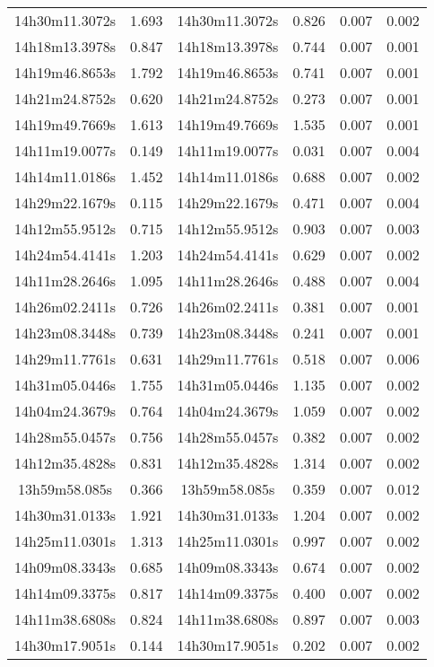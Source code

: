 \begin{table}
\begin{tabular}{cccccc}
14h30m11.3072s & 1.693 & 14h30m11.3072s & 0.826 & 0.007 & 0.002 \\
14h18m13.3978s & 0.847 & 14h18m13.3978s & 0.744 & 0.007 & 0.001 \\
14h19m46.8653s & 1.792 & 14h19m46.8653s & 0.741 & 0.007 & 0.001 \\
14h21m24.8752s & 0.620 & 14h21m24.8752s & 0.273 & 0.007 & 0.001 \\
14h19m49.7669s & 1.613 & 14h19m49.7669s & 1.535 & 0.007 & 0.001 \\
14h11m19.0077s & 0.149 & 14h11m19.0077s & 0.031 & 0.007 & 0.004 \\
14h14m11.0186s & 1.452 & 14h14m11.0186s & 0.688 & 0.007 & 0.002 \\
14h29m22.1679s & 0.115 & 14h29m22.1679s & 0.471 & 0.007 & 0.004 \\
14h12m55.9512s & 0.715 & 14h12m55.9512s & 0.903 & 0.007 & 0.003 \\
14h24m54.4141s & 1.203 & 14h24m54.4141s & 0.629 & 0.007 & 0.002 \\
14h11m28.2646s & 1.095 & 14h11m28.2646s & 0.488 & 0.007 & 0.004 \\
14h26m02.2411s & 0.726 & 14h26m02.2411s & 0.381 & 0.007 & 0.001 \\
14h23m08.3448s & 0.739 & 14h23m08.3448s & 0.241 & 0.007 & 0.001 \\
14h29m11.7761s & 0.631 & 14h29m11.7761s & 0.518 & 0.007 & 0.006 \\
14h31m05.0446s & 1.755 & 14h31m05.0446s & 1.135 & 0.007 & 0.002 \\
14h04m24.3679s & 0.764 & 14h04m24.3679s & 1.059 & 0.007 & 0.002 \\
14h28m55.0457s & 0.756 & 14h28m55.0457s & 0.382 & 0.007 & 0.002 \\
14h12m35.4828s & 0.831 & 14h12m35.4828s & 1.314 & 0.007 & 0.002 \\
13h59m58.085s & 0.366 & 13h59m58.085s & 0.359 & 0.007 & 0.012 \\
14h30m31.0133s & 1.921 & 14h30m31.0133s & 1.204 & 0.007 & 0.002 \\
14h25m11.0301s & 1.313 & 14h25m11.0301s & 0.997 & 0.007 & 0.002 \\
14h09m08.3343s & 0.685 & 14h09m08.3343s & 0.674 & 0.007 & 0.002 \\
14h14m09.3375s & 0.817 & 14h14m09.3375s & 0.400 & 0.007 & 0.002 \\
14h11m38.6808s & 0.824 & 14h11m38.6808s & 0.897 & 0.007 & 0.003 \\
14h30m17.9051s & 0.144 & 14h30m17.9051s & 0.202 & 0.007 & 0.002 \\

\end{tabular}
\end{table}
